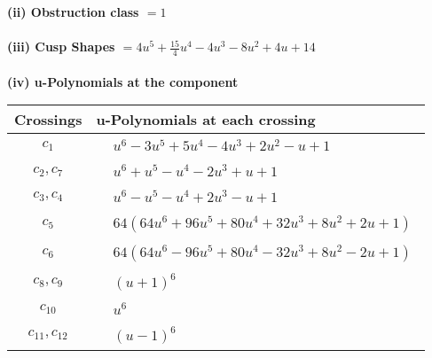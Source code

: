 \documentclass[1p]{elsarticle_modified}
\theoremstyle{definition}
\begin{document}
\flushleft \textbf{(ii) Obstruction class $= 1$}\\~\\
\flushleft \textbf{(iii) Cusp Shapes $= 4 u^5+\frac{15}{4} u^4-4 u^3-8 u^2+4 u+14$}\\~\\
\newpage\renewcommand{\arraystretch}{1}
\flushleft \textbf{(iv) u-Polynomials at the component}\newline \\
\begin{tabular}{m{50pt}|m{274pt}}
Crossings & \hspace{64pt}u-Polynomials at each crossing \\
\hline $$\begin{aligned}c_{1}\end{aligned}$$&$\begin{aligned}
&u^6-3 u^5+5 u^4-4 u^3+2 u^2- u+1
\end{aligned}$\\
\hline $$\begin{aligned}c_{2},c_{7}\end{aligned}$$&$\begin{aligned}
&u^6+u^5- u^4-2 u^3+u+1
\end{aligned}$\\
\hline $$\begin{aligned}c_{3},c_{4}\end{aligned}$$&$\begin{aligned}
&u^6- u^5- u^4+2 u^3- u+1
\end{aligned}$\\
\hline $$\begin{aligned}c_{5}\end{aligned}$$&$\begin{aligned}
&64(64 u^6+96 u^5+80 u^4+32 u^3+8 u^2+2 u+1)
\end{aligned}$\\
\hline $$\begin{aligned}c_{6}\end{aligned}$$&$\begin{aligned}
&64(64 u^6-96 u^5+80 u^4-32 u^3+8 u^2-2 u+1)
\end{aligned}$\\
\hline $$\begin{aligned}c_{8},c_{9}\end{aligned}$$&$\begin{aligned}
&(u+1)^6
\end{aligned}$\\
\hline $$\begin{aligned}c_{10}\end{aligned}$$&$\begin{aligned}
&u^6
\end{aligned}$\\
\hline $$\begin{aligned}c_{11},c_{12}\end{aligned}$$&$\begin{aligned}
&(u-1)^6
\end{aligned}$\\
\hline
\end{tabular}\\~\\
\end{document}
